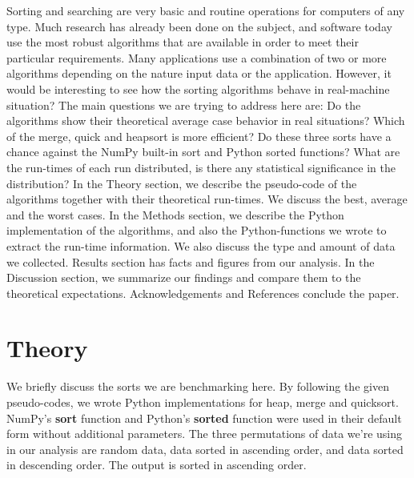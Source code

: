 \documentclass[sigconf, nonacm, natbib, screen, balance=False]{acmart}
\begin{document}
Sorting and searching are very basic and routine operations for computers of any type. Much research has already been done on the subject, and software today use the most robust algorithms that are available in order to meet their particular requirements. Many applications use a combination of two or more algorithms depending on the nature input data or the application. However, it would be interesting to see how the  sorting algorithms behave in real-machine situation?\newline
\label{questions}The main questions we are trying to address here are: Do the algorithms show their theoretical average case behavior in real situations? Which of the merge, quick and heapsort is more efficient? Do these three sorts have a chance against the NumPy built-in sort and Python sorted functions? What are the run-times of each run distributed, is there any statistical significance in the distribution? \newline
In the Theory section, we describe the pseudo-code of the algorithms together with their theoretical run-times. We discuss the best, average and the worst cases.  In the Methods section, we describe the Python implementation of the algorithms, and also the Python-functions we wrote to extract the run-time information. We also discuss the type and amount of data we collected. Results section has facts and figures from our analysis. In the Discussion section, we summarize our findings and compare them to the theoretical expectations. Acknowledgements and References conclude the paper.

\section{Theory}\label{sec:theory}
We briefly discuss the sorts we are benchmarking here. By following the given pseudo-codes, we wrote Python implementations for heap, merge and quicksort. NumPy's \textbf{sort} function and Python's \textbf{sorted} function were used in their default form without additional parameters. The three permutations of data we're using in our analysis are random data, data sorted in ascending order, and data sorted in descending order. The output is sorted in ascending order.
\end{document}
